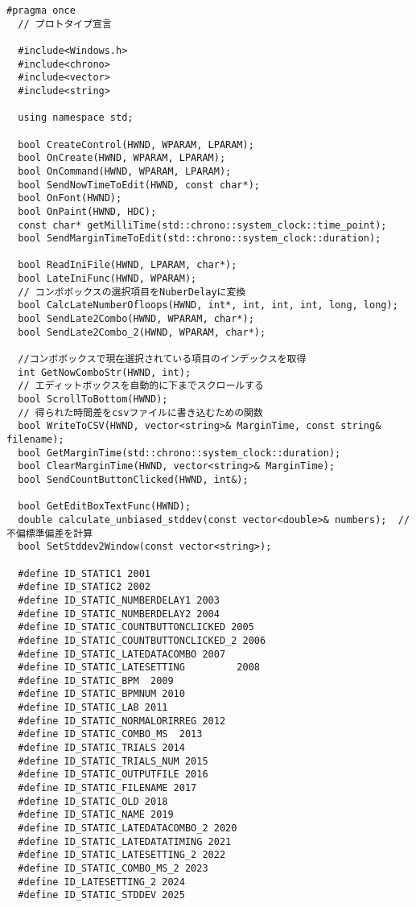 \begin{lstlisting}[caption=window.h]
  #pragma once
  // プロトタイプ宣言

  #include<Windows.h>
  #include<chrono>
  #include<vector>
  #include<string>

  using namespace std;

  bool CreateControl(HWND, WPARAM, LPARAM);
  bool OnCreate(HWND, WPARAM, LPARAM);
  bool OnCommand(HWND, WPARAM, LPARAM);
  bool SendNowTimeToEdit(HWND, const char*);
  bool OnFont(HWND);
  bool OnPaint(HWND, HDC);
  const char* getMilliTime(std::chrono::system_clock::time_point);
  bool SendMarginTimeToEdit(std::chrono::system_clock::duration);

  bool ReadIniFile(HWND, LPARAM, char*);
  bool LateIniFunc(HWND, WPARAM);
  // コンボボックスの選択項目をNuberDelayに変換
  bool CalcLateNumberOfloops(HWND, int*, int, int, int, long, long);
  bool SendLate2Combo(HWND, WPARAM, char*);
  bool SendLate2Combo_2(HWND, WPARAM, char*);

  //コンボボックスで現在選択されている項目のインデックスを取得
  int GetNowComboStr(HWND, int);
  // エディットボックスを自動的に下までスクロールする
  bool ScrollToBottom(HWND);
  // 得られた時間差をcsvファイルに書き込むための関数
  bool WriteToCSV(HWND, vector<string>& MarginTime, const string& filename);
  bool GetMarginTime(std::chrono::system_clock::duration);
  bool ClearMarginTime(HWND, vector<string>& MarginTime);
  bool SendCountButtonClicked(HWND, int&);

  bool GetEditBoxTextFunc(HWND);
  double calculate_unbiased_stddev(const vector<double>& numbers);  // 不偏標準偏差を計算
  bool SetStddev2Window(const vector<string>);

  #define ID_STATIC1 2001
  #define ID_STATIC2 2002
  #define ID_STATIC_NUMBERDELAY1 2003
  #define ID_STATIC_NUMBERDELAY2 2004
  #define ID_STATIC_COUNTBUTTONCLICKED 2005
  #define ID_STATIC_COUNTBUTTONCLICKED_2 2006
  #define ID_STATIC_LATEDATACOMBO 2007
  #define ID_STATIC_LATESETTING         2008
  #define ID_STATIC_BPM  2009
  #define ID_STATIC_BPMNUM 2010
  #define ID_STATIC_LAB 2011
  #define ID_STATIC_NORMALORIRREG 2012
  #define ID_STATIC_COMBO_MS  2013
  #define ID_STATIC_TRIALS 2014
  #define ID_STATIC_TRIALS_NUM 2015
  #define ID_STATIC_OUTPUTFILE 2016
  #define ID_STATIC_FILENAME 2017
  #define ID_STATIC_OLD 2018
  #define ID_STATIC_NAME 2019
  #define ID_STATIC_LATEDATACOMBO_2 2020
  #define ID_STATIC_LATEDATATIMING 2021
  #define ID_STATIC_LATESETTING_2 2022
  #define ID_STATIC_COMBO_MS_2 2023
  #define ID_LATESETTING_2 2024
  #define ID_STATIC_STDDEV 2025



\end{lstlisting}
